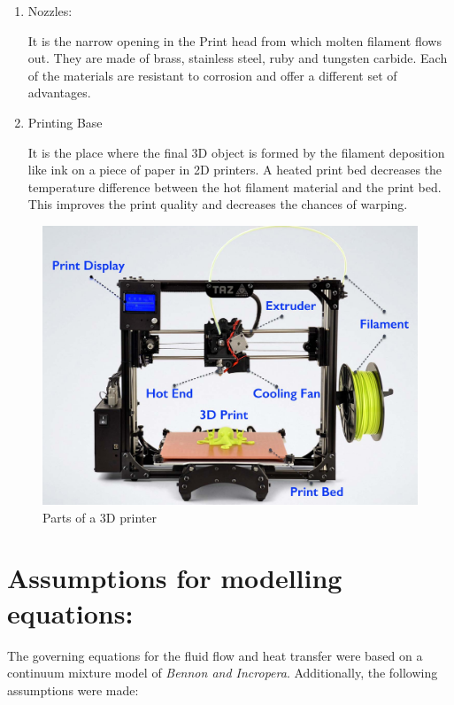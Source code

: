 \documentclass{report}
\begin{document}
\begin{enumerate}
    \item Nozzles:
    
    It is the narrow opening in the Print head from which molten filament flows out. They are made of brass, stainless steel, ruby and tungsten carbide. Each of the materials are resistant to corrosion and offer a different set of advantages.

    \item Printing Base

    It is the place where the final 3D object is formed by the filament deposition like ink on a piece of paper in 2D printers. A heated print bed decreases the temperature difference between the hot filament material and the print bed. This improves the print quality and decreases the chances of warping.
    
\end{enumerate}

\begin{figure}[!ht]
    \centering
    \includegraphics[scale=0.1]{Parts.jpg}
    \caption{Parts of a 3D printer}
    \label{fig:Parts}
\end{figure}

\section{Assumptions for modelling equations:}
The governing equations for the fluid flow and heat transfer were 
based on a continuum mixture model of \textit{Bennon and Incropera}. Additionally, the following assumptions were made: 
\end{document}
